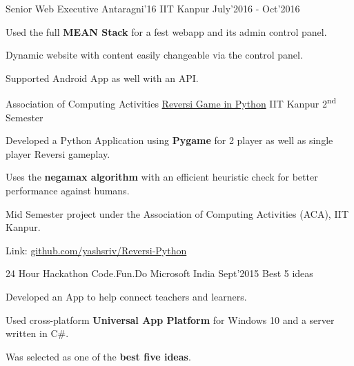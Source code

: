 \begin{cventries}
  \ifdefined\ONEPAGE
  \else
  \cventry
  {Senior Web Executive}
  {Antaragni'16}
  {IIT Kanpur}
  {July'2016 - Oct'2016}
  {
    \begin{cvitems}
    \item Used the full \textbf{MEAN Stack} for a fest webapp and its admin control panel.
    \item Dynamic website with content easily changeable via the control panel.
    \item Supported Android App as well with an API.
    \end{cvitems}
  }
  \fi

  \smallcventry
  {Association of Computing Activities}
  {\href{http://github.com/yashsriv/Reversi-Python}{Reversi Game in Python}}
  {IIT Kanpur}
  {2\textsuperscript{nd} Semester}
  {}
  {
    \begin{cvitems}
    \item Developed a Python Application using \textbf{Pygame} for 2 player as well as
      single player Reversi gameplay.
    \item Uses the \textbf{negamax algorithm} with an efficient heuristic check
      for better performance against humans.
    \item Mid Semester project under the Association of Computing Activities (ACA), IIT Kanpur.
    \item Link: \href{https://github.com/yashsriv/Reversi-Python}{github.com/yashsriv/Reversi-Python}
    \end{cvitems}
  }

  \smallcventry
  {24 Hour Hackathon}
  {Code.Fun.Do}
  {Microsoft India}
  {Sept'2015}
  {Best 5 ideas}
  {
    \begin{cvitems}
    \item Developed an App to help connect teachers and learners.
    \item Used cross-platform \textbf{Universal App Platform} for Windows 10
      and a server written in C\#.
    \item Was selected as one of the \textbf{best five ideas}.
    \end{cvitems}
  }

\end{cventries}

